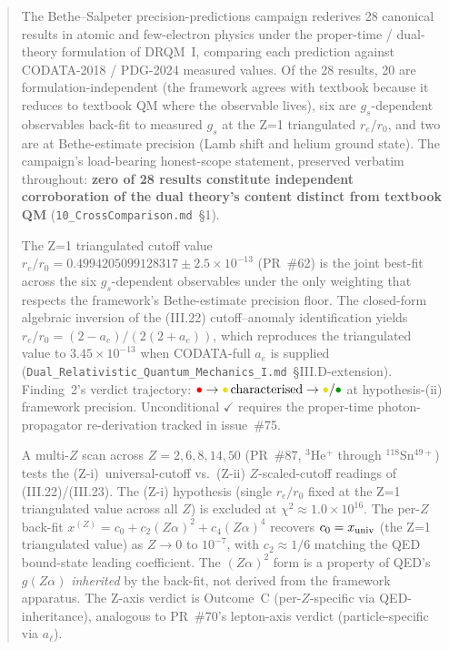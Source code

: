 \begin{abstract}
\noindent The Bethe--Salpeter precision-predictions campaign rederives 28
canonical results in atomic and few-electron physics under the proper-time /
dual-theory formulation of DRQM~I, comparing each prediction against
CODATA-2018 / PDG-2024 measured values. Of the 28 results, 20 are
formulation-independent (the framework agrees with textbook because it
reduces to textbook QM where the observable lives), six are
$g_s$-dependent observables back-fit to measured $g_s$ at the Z=1
triangulated $r_e/r_0$, and two are at Bethe-estimate precision (Lamb shift
and helium ground state). The campaign's load-bearing honest-scope statement,
preserved verbatim throughout: \textbf{zero of 28 results constitute
independent corroboration of the dual theory's content distinct from
textbook QM} (\texttt{10\_CrossComparison.md}~\S1).

\bigskip

\noindent The Z=1 triangulated cutoff value $r_e/r_0 = 0.4994205099128317
\pm 2.5\times 10^{-13}$ (PR~\#62) is the joint best-fit across the six
$g_s$-dependent observables under the only weighting that respects the
framework's Bethe-estimate precision floor. The closed-form algebraic
inversion of the (III.22) cutoff--anomaly identification yields
$r_e/r_0 = (2 - a_e)/(2(2 + a_e))$, which reproduces the triangulated value
to $3.45\times 10^{-13}$ when CODATA-full $a_e$ is supplied
(\texttt{Dual\_Relativistic\_Quantum\_Mechanics\_I.md}~\S III.D-extension).
Finding~2's verdict trajectory:
$\mathbin{\hbox{\color{red}\(\bullet\)}} \to
 \mathbin{\hbox{\color{yellow!90!black}\(\bullet\)}}\,\text{characterised} \to
 \mathbin{\hbox{\color{yellow!90!black}\(\bullet\)}}/
 \mathbin{\hbox{\color{green!60!black}\(\bullet\)}}$
at hypothesis-(ii) framework precision. Unconditional \(\checkmark\) requires
the proper-time photon-propagator re-derivation tracked in issue~\#75.

\bigskip

\noindent A multi-$Z$ scan across $Z = 2, 6, 8, 14, 50$ (PR~\#87, $^3$He$^+$
through $^{118}$Sn$^{49+}$) tests the (Z-i)~universal-cutoff vs.~(Z-ii)
$Z$-scaled-cutoff readings of (III.22)/(III.23). The (Z-i) hypothesis (single
$r_e/r_0$ fixed at the Z=1 triangulated value across all $Z$) is excluded at
$\chi^2 \approx 1.0\times 10^{16}$. The per-$Z$ back-fit
$x^{(Z)} = c_0 + c_2(Z\alpha)^2 + c_4(Z\alpha)^4$ recovers $c_0 = x_{\rm univ}$
(the Z=1 triangulated value) as $Z\to 0$ to $10^{-7}$, with
$c_2 \approx 1/6$ matching the QED bound-state leading coefficient. The
$(Z\alpha)^2$ form is a property of QED's $g(Z\alpha)$
\emph{inherited} by the back-fit, not derived from the framework apparatus.
The Z-axis verdict is Outcome~C (per-$Z$-specific via QED-inheritance),
analogous to PR~\#70's lepton-axis verdict (particle-specific via
$a_\ell$).


\end{abstract}
